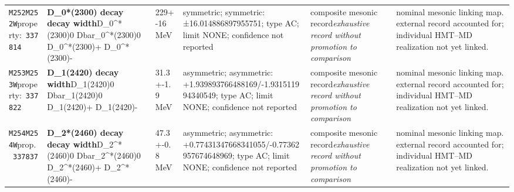\begin{landscape}
\begin{longtable}{L{1.85cm}L{4.45cm}L{2.35cm}L{4.05cm}L{3.35cm}L{7.15cm}}
\texttt{M252}\newline \texttt{M252W}\newline property:\ \texttt{337814} & \textbf{D\_\allowbreak{}0*(2300) decay decay width}\newline D\_\allowbreak{}0\textasciicircum{}*(2300)0 \textbar{}\allowbreak{} Dbar\_\allowbreak{}0\textasciicircum{}*(2300)0 \textbar{}\allowbreak{} D\_\allowbreak{}0\textasciicircum{}*(2300)+ \textbar{}\allowbreak{} D\_\allowbreak{}0\textasciicircum{}*(2300)- & 229+-16\,MeV & symmetric; symmetric: ±16.014886897955751; type AC; limit NONE; confidence not reported & composite mesonic record\newline \emph{exhaustive record without promotion to comparison} & nominal mesonic linking map. external record accounted for; individual HMT--MD realization not yet linked. \\
\texttt{M253}\newline \texttt{M253W}\newline property:\ \texttt{337822} & \textbf{D\_\allowbreak{}1(2420) decay width}\newline D\_\allowbreak{}1(2420)0 \textbar{}\allowbreak{} Dbar\_\allowbreak{}1(2420)0 \textbar{}\allowbreak{} D\_\allowbreak{}1(2420)+ \textbar{}\allowbreak{} D\_\allowbreak{}1(2420)- & 31.3+-1.9\,MeV & asymmetric; asymmetric: +1.939893766488169/-1.931511994340549; type AC; limit NONE; confidence not reported & composite mesonic record\newline \emph{exhaustive record without promotion to comparison} & nominal mesonic linking map. external record accounted for; individual HMT--MD realization not yet linked. \\
\texttt{M254}\newline \texttt{M254W}\newline prop.\ \texttt{337837} & \textbf{D\_\allowbreak{}2*(2460) decay decay width}\newline D\_\allowbreak{}2\textasciicircum{}*(2460)0 \textbar{}\allowbreak{} Dbar\_\allowbreak{}2\textasciicircum{}*(2460)0 \textbar{}\allowbreak{} D\_\allowbreak{}2\textasciicircum{}*(2460)+ \textbar{}\allowbreak{} D\_\allowbreak{}2\textasciicircum{}*(2460)- & 47.3+-0.8\,MeV & asymmetric; asymmetric: +0.77431347668341055/-0.77362957674648969; type AC; limit NONE; confidence not reported & composite mesonic record\newline \emph{exhaustive record without promotion to comparison} & nominal mesonic linking map. external record accounted for; individual HMT--MD realization not yet linked. \\

\end{longtable}
\end{landscape}
